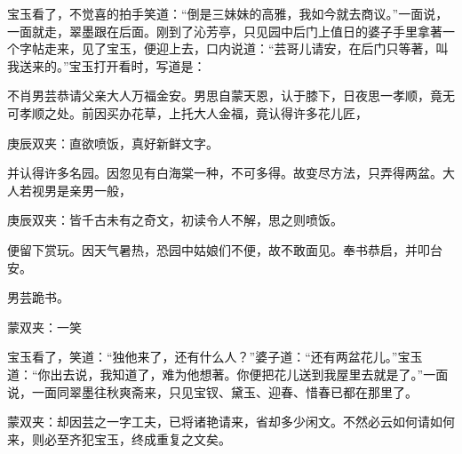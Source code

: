 \begin{parag}
    宝玉看了，不觉喜的拍手笑道：“倒是三妹妹的高雅，我如今就去商议。”一面说，一面就走，翠墨跟在后面。刚到了沁芳亭，只见园中后门上值日的婆子手里拿著一个字帖走来，见了宝玉，便迎上去，口内说道：“芸哥儿请安，在后门只等著，叫我送来的。”宝玉打开看时，写道是：
\end{parag}


\begin{qute2sp}
    \begin{parag}
        不肖男芸恭请父亲大人万福金安。男思自蒙天恩，认于膝下，日夜思一孝顺，竟无可孝顺之处。前因买办花草，上托大人金福，竟认得许多花儿匠，\begin{note}庚辰双夹：直欲喷饭，真好新鲜文字。\end{note}并认得许多名园。因忽见有白海棠一种，不可多得。故变尽方法，只弄得两盆。大人若视男是亲男一般，\begin{note}庚辰双夹：皆千古未有之奇文，初读令人不解，思之则喷饭。\end{note}便留下赏玩。因天气暑热，恐园中姑娘们不便，故不敢面见。奉书恭启，并叩台安。
    \end{parag}

    \begin{parag}
        男芸跪书。\begin{note}蒙双夹：一笑\end{note}
    \end{parag}
\end{qute2sp}


\begin{parag}
    宝玉看了，笑道：“独他来了，还有什么人？”婆子道：“还有两盆花儿。”宝玉道：“你出去说，我知道了，难为他想著。你便把花儿送到我屋里去就是了。”一面说，一面同翠墨往秋爽斋来，只见宝钗、黛玉、迎春、惜春已都在那里了。\begin{note}蒙双夹：却因芸之一字工夫，已将诸艳请来，省却多少闲文。不然必云如何请如何来，则必至齐犯宝玉，终成重复之文矣。\end{note}
\end{parag}


